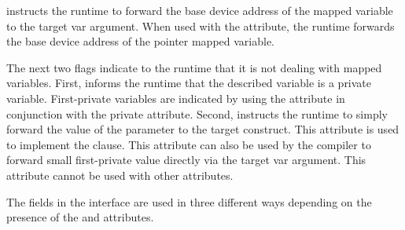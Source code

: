  instructs the runtime to forward the base device address of the mapped variable to the target var argument.  When used with  the  attribute, the runtime forwards the base device address of the pointer mapped variable. 

The next two flags indicate to the runtime that it is not dealing with mapped variables.  First,  informs the runtime that the described variable is a private variable. First-private variables are indicated by using the    attribute in conjunction with the private attribute. Second,  instructs the runtime to simply forward the value of the  parameter to the target construct.  This attribute is used to implement the  clause. This attribute can also be used by the compiler to forward small first-private value directly via the target var argument. This attribute cannot be used with other attributes.

The fields in the interface are used in three different ways depending on the presence of the  and  attributes.

